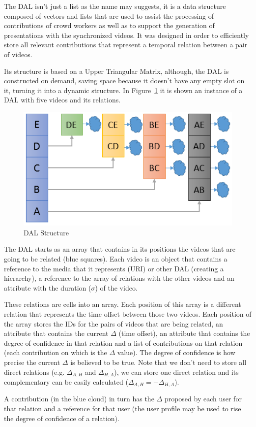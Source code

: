 The DAL isn't just a list as the name may suggests, it is a data structure composed of vectors and lists that are used to assist the processing of contributions of crowd workers as well as to support the generation of presentations with the synchronized videos. It was designed in order to efficiently store all relevant contributions that represent a temporal relation between a pair of videos.

Its structure is based on a Upper Triangular Matrix, although, the DAL is constructed on demand, saving space because it doesn't have any empty slot on it, turning it into a dynamic structure. In Figure~\ref{structure-dal} it is shown an instance of a DAL with five videos and its relations.

\begin{figure}[h]
	\centerline{\includegraphics[scale=0.7] {figure/DAL/dal}}
	\caption{DAL Structure}
	\label{structure-dal}
\end{figure}

The DAL starts as an array that contains in its positions the videos that are going to be related (blue squares). Each video is an object that contains a reference to the media that it represents (URI) or other DAL (creating a hierarchy), a reference to the array of relations with the other videos and an attribute with the duration ($\sigma$) of the video.

These relations are cells into an array. Each position of this array is a different relation that represents the time offset between those two videos. Each position of the array stores the IDs for the pairs of videos that are being related, an attribute that contains the current $\Delta$ (time offset), an attribute that contains the degree of confidence in that relation and a list of contributions on that relation (each contribution on which is the $\Delta$ value). The degree of confidence is how precise the current $\Delta$ is believed to be true. Note that we don't need to store all direct relations (e.g. $\Delta_{A,H}$ and $\Delta_{H,A}$), we can store one direct relation and its complementary can be easily calculated ($\Delta_{A,H} = -\Delta_{H,A}$).

A contribution (in the blue cloud) in turn has the $\Delta$ proposed by each user for that relation and a reference for that user (the user profile may be used to rise the degree of confidence of a relation).